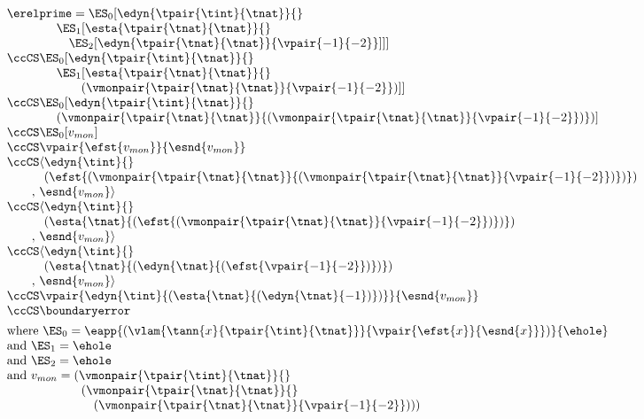 $\begin{array}{l}
  \erelprime = \ES_0[\edyn{\tpair{\tint}{\tnat}}{}
\\\qquad\quad\quad \ES_1[\esta{\tpair{\tnat}{\tnat}}{}
\\\qquad\quad\quad\quad \ES_2[\edyn{\tpair{\tnat}{\tnat}}{\vpair{-1}{-2}}]]]
\\\ccCS \ES_0[\edyn{\tpair{\tint}{\tnat}}{}
\\\qquad\qquad \ES_1[\esta{\tpair{\tnat}{\tnat}}{}
\\\qquad\qquad\qquad (\vmonpair{\tpair{\tnat}{\tnat}}{\vpair{-1}{-2}})]]
\\\ccCS \ES_0[\edyn{\tpair{\tint}{\tnat}}{}
\\\qquad\qquad (\vmonpair{\tpair{\tnat}{\tnat}}{(\vmonpair{\tpair{\tnat}{\tnat}}{\vpair{-1}{-2}})})]
\\\ccCS \ES_0[v_{mon}]
\\\ccCS \vpair{\efst{v_{mon}}}{\esnd{v_{mon}}}
\\\ccCS \langle\edyn{\tint}{}
\\\qquad\quad (\efst{(\vmonpair{\tpair{\tnat}{\tnat}}{(\vmonpair{\tpair{\tnat}{\tnat}}{\vpair{-1}{-2}})})})
\\\qquad ,\,{\esnd{v_{mon}}}\rangle
\\\ccCS \langle\edyn{\tint}{}
\\\qquad\quad (\esta{\tnat}{(\efst{(\vmonpair{\tpair{\tnat}{\tnat}}{\vpair{-1}{-2}})})})
\\\qquad ,\,{\esnd{v_{mon}}}\rangle
\\\ccCS \langle\edyn{\tint}{}
\\\qquad\quad (\esta{\tnat}{(\edyn{\tnat}{(\efst{\vpair{-1}{-2}})})})
\\\qquad ,\,\esnd{v_{mon}}\rangle
\\\ccCS \vpair{\edyn{\tint}{(\esta{\tnat}{(\edyn{\tnat}{{-1}})})}}{\esnd{v_{mon}}}
\\\ccCS \boundaryerror
\\[1ex]
  \mbox{where } \ES_0 = \eapp{(\vlam{\tann{x}{\tpair{\tint}{\tnat}}}{\vpair{\efst{x}}{\esnd{x}}})}{\ehole}
\\\mbox{and } \ES_1 = \ehole
\\\mbox{and } \ES_2 = \ehole
\\\mbox{and } v_{mon} = (\vmonpair{\tpair{\tint}{\tnat}}{}
\\\qquad\qquad\qquad (\vmonpair{\tpair{\tnat}{\tnat}}{}
\\\qquad\qquad\qquad\quad (\vmonpair{\tpair{\tnat}{\tnat}}{\vpair{-1}{-2}})))
\end{array}$


